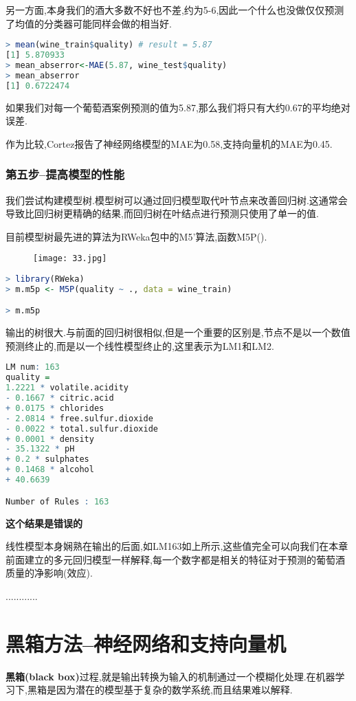 \documentclass[11pt,a4paper,oneside]{book}
\begin{document}
另一方面,本身我们的酒大多数不好也不差,约为5-6,因此一个什么也没做仅仅预测了均值的分类器可能同样会做的相当好.
\begin{lstlisting}[language=r]
> mean(wine_train$quality) # result = 5.87
[1] 5.870933 
> mean_abserror<-MAE(5.87, wine_test$quality)
> mean_abserror
[1] 0.6722474
\end{lstlisting}
如果我们对每一个葡萄酒案例预测的值为5.87,那么我们将只有大约0.67的平均绝对误差.

作为比较,Cortez报告了神经网络模型的MAE为0.58,支持向量机的MAE为0.45.

\subsection{第五步--提高模型的性能}
我们尝试构建模型树.模型树可以通过回归模型取代叶节点来改善回归树.这通常会导致比回归树更精确的结果,而回归树在叶结点进行预测只使用了单一的值.

目前模型树最先进的算法为RWeka包中的M5'算法,函数M5P().
\begin{figure}[H]
	\centering
	\texttt{[image: 33.jpg]}
\end{figure}

\begin{lstlisting}[language=r]
> library(RWeka)
> m.m5p <- M5P(quality ~ ., data = wine_train)

> m.m5p
\end{lstlisting}
输出的树很大.与前面的回归树很相似,但是一个重要的区别是,节点不是以一个数值预测终止的,而是以一个线性模型终止的,这里表示为LM1和LM2.
\begin{lstlisting}[language=r]
LM num: 163
quality = 
1.2221 * volatile.acidity 
- 0.1667 * citric.acid 
+ 0.0175 * chlorides 
- 2.0814 * free.sulfur.dioxide 
- 0.0022 * total.sulfur.dioxide 
+ 0.0001 * density 
- 35.1322 * pH 
+ 0.2 * sulphates 
+ 0.1468 * alcohol 
+ 40.6639

Number of Rules : 163
\end{lstlisting}

\textbf{\color{red}这个结果是错误的}

线性模型本身娴熟在输出的后面,如LM163如上所示,这些值完全可以向我们在本章前面建立的多元回归模型一样解释,每一个数字都是相关的特征对于预测的葡萄酒质量的净影响(效应).

............


\chapter{黑箱方法--神经网络和支持向量机}
\textbf{黑箱(black box)}过程,就是输出转换为输入的机制通过一个模糊化处理.在机器学习下,黑箱是因为潜在的模型基于复杂的数学系统,而且结果难以解释.
\end{document}
